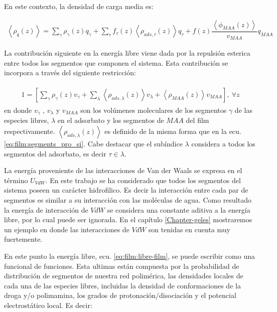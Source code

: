 En este contexto, la densidad de carga media es:

\begin{align}
	\left<\rho_q(z)\right> = \sum_{\gamma } {\rho_\gamma(z) q_\gamma + \sum_\tau{f_\tau(z) \left<\rho_{ads,\tau}(z)\right> q_\tau} +  f(z)\dfrac{\left<\phi_{MAA}(z)\right>}{v_{MAA}}q_{MAA}}
	\label{eq:film:rho_charge}
\end{align}

La contribuci\'on siguiente en la energ\'ia libre viene dada por la repulsi\'on esterica entre  todos los segmentos que componen  el sistema. Esta contribuci\'on se incorpora a trav\'es del siguiente restricci\'on:  

\begin{align}
	\begin{aligned}
		1=  {\left[\sum_{\gamma}\rho_\gamma(z) v_\gamma + \sum_\lambda{\left<\rho_{ads,\lambda}(z)\right>v_\lambda} + \left<\rho_{MAA}(z)\right>v_{MAA} \right]},~ \forall z
	\end{aligned}
	\label{eq:film:constraint}
\end{align}
\noindent en donde $v_\gamma$ , $v_\lambda$ y $v_{MAA}$ son los vol\'umenes moleculares de los segmentos $\gamma$ de las especies libres, $\lambda$  en el adsorbato y los segmentos de $MAA$ del film respectivamente.
$\left<\rho_{ads,\lambda}(z)\right>$ es definido de la misma forma que en la ecu.  \ref{eq:film:segments_pro_si}.
Cabe destacar que el sub\'indice $\lambda$ considera a todos los segmentos del adsorbato, es decir $ \tau \in \lambda$.

La energ\'ia proveniente de las interacciones de Van der Waals se expresa en el t\'ermino $U_{VdW}$. En este trabajo se ha considerado que todos los segmentos del sistema poseen un car\'acter hidrofilico. Es decir la interacci\'on entre cada par de segmentos es similar a su interacci\'on con las mol\'eculas de agua. Como resultado la energ\'ia de interacci\'on de $VdW$ se considera una constante aditiva a la energ\'ia libre, por lo cual puede ser ignorada. En el cap\'itulo \ref{Chapter-geles} mostraremos un ejemplo en donde las interacciones de $VdW$ son tenidas en cuenta muy fuertemente. 

En este punto la energ\'ia libre, ecu. \ref{eq:film:libre-film}, se puede escribir como una funcional de funciones. Esta ultimas est\'an compuesta por la probabilidad de distribuci\'on de segmentos de nuestra red polim\'erica, las densidades locales de cada una de las especies libres, incluidas la densidad de conformaciones de la droga y/o polimamina, los grados de protonaci\'on/disociaci\'on y el potencial electrost\'atico local. Es decir:

